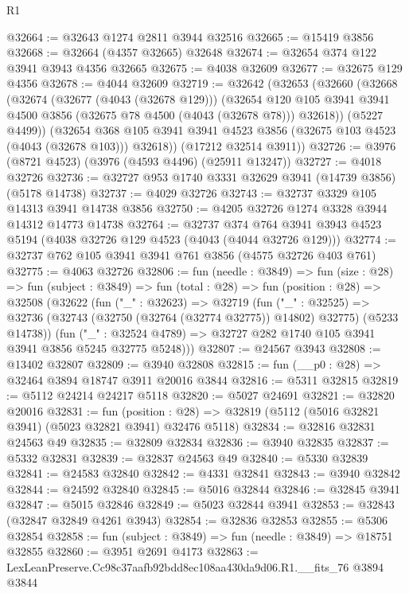 \begin{lexlean}{R1}
\begin{coremodule}
@32664 := @32643 @1274 @2811 @3944 @32516
@32665 := @15419 @3856
@32668 := @32664 (@4357 @32665) @32648
@32674 := @32654 @374 @122 @3941 @3943 @4356 @32665
@32675 := @4038 @32609
@32677 := @32675 @129 @4356
@32678 := @4044 @32609
@32719 := @32642
    (@32653
      (@32660
        (@32668
          (@32674
            (@32677 (@4043 (@32678 @129)))
            (@32654
              @120
              @105
              @3941
              @3941
              @4500
              @3856
              (@32675 @78 @4500 (@4043 (@32678 @78)))
              @32618))
          (@5227 @4499))
        (@32654 @368 @105 @3941 @3941 @4523 @3856 (@32675 @103 @4523 (@4043 (@32678 @103))) @32618))
      (@17212 @32514 @3911))
@32726 := @3976 (@8721 @4523) (@3976 (@4593 @4496) (@25911 @13247))
@32727 := @4018 @32726
@32736 := @32727 @953 @1740 @3331 @32629 @3941 (@14739 @3856) (@5178 @14738)
@32737 := @4029 @32726
@32743 := @32737 @3329 @105 @14313 @3941 @14738 @3856
@32750 := @4205 @32726 @1274 @3328 @3944 @14312 @14773 @14738
@32764 := @32737
    @374
    @764
    @3941
    @3943
    @4523
    @5194
    (@4038 @32726 @129 @4523 (@4043 (@4044 @32726 @129)))
@32774 := @32737 @762 @105 @3941 @3941 @761 @3856 (@4575 @32726 @403 @761)
@32775 := @4063 @32726
@32806 := fun (needle : @3849) =>
  fun (size : @28) =>
  fun (subject : @3849) =>
  fun (total : @28) =>
  fun (position : @28) =>
  @32508
    (@32622
      (fun ("_" : @32623) =>
      @32719
        (fun ("_" : @32525) =>
        @32736 (@32743 (@32750 (@32764 (@32774 @32775)) @14802) @32775) (@5233 @14738))
        (fun ("_" : @32524 @4789) => @32727 @282 @1740 @105 @3941 @3941 @3856 @5245 @32775 @5248)))
@32807 := @24567 @3943
@32808 := @13402 @32807
@32809 := @3940 @32808
@32815 := fun (__p0 : @28) => @32464 @3894 @18747 @3911 @20016 @3844
@32816 := @5311 @32815
@32819 := @5112 @24214 @24217 @5118
@32820 := @5027 @24691
@32821 := @32820 @20016
@32831 := fun (position : @28) =>
  @32819 (@5112 (@5016 @32821 @3941) (@5023 @32821 @3941) @32476 @5118)
@32834 := @32816 @32831 @24563 @49
@32835 := @32809 @32834
@32836 := @3940 @32835
@32837 := @5332 @32831
@32839 := @32837 @24563 @49
@32840 := @5330 @32839
@32841 := @24583 @32840
@32842 := @4331 @32841
@32843 := @3940 @32842
@32844 := @24592 @32840
@32845 := @5016 @32844
@32846 := @32845 @3941
@32847 := @5015 @32846
@32849 := @5023 @32844 @3941
@32853 := @32843 (@32847 @32849 @4261 @3943)
@32854 := @32836 @32853
@32855 := @5306 @32854
@32858 := fun (subject : @3849) => fun (needle : @3849) => @18751 @32855
@32860 := @3951 @2691 @4173
@32863 := LexLeanPreserve.Cc98c37aafb92bdd8ec108aa430da9d06.R1.__fits_76 @3894 @3844

\end{coremodule}
\end{lexlean}
